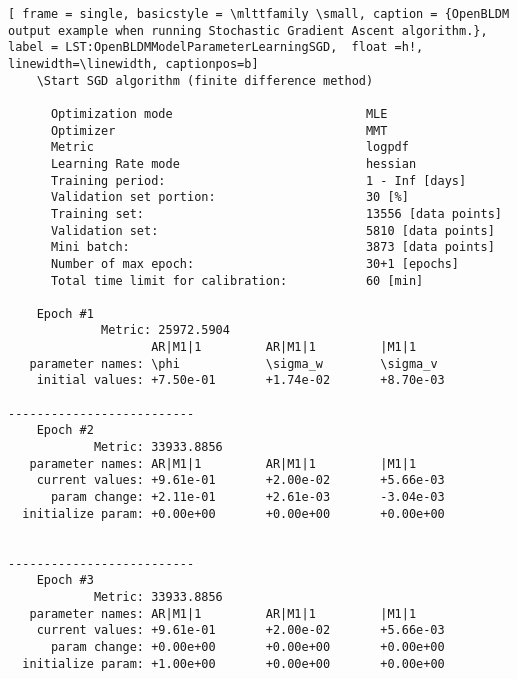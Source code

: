  \begin{lstlisting}[ frame = single, basicstyle = \mlttfamily \small, caption = {OpenBLDM output example when running Stochastic Gradient Ascent algorithm.}, label = LST:OpenBLDMModelParameterLearningSGD,  float =h!, linewidth=\linewidth, captionpos=b]
    \Start SGD algorithm (finite difference method)

      Optimization mode                           MLE
      Optimizer                                   MMT
      Metric                                      logpdf
      Learning Rate mode                          hessian
      Training period:                            1 - Inf [days]
      Validation set portion:                     30 [%]
      Training set:                               13556 [data points]
      Validation set:                             5810 [data points]
      Mini batch:                                 3873 [data points]
      Number of max epoch:                        30+1 [epochs]
      Total time limit for calibration:           60 [min]

    Epoch #1
             Metric: 25972.5904
                    AR|M1|1         AR|M1|1         |M1|1           
   parameter names: \phi            \sigma_w        \sigma_v        
    initial values: +7.50e-01       +1.74e-02       +8.70e-03       

--------------------------
    Epoch #2
            Metric: 33933.8856
   parameter names: AR|M1|1         AR|M1|1         |M1|1           
    current values: +9.61e-01       +2.00e-02       +5.66e-03      
      param change: +2.11e-01       +2.61e-03       -3.04e-03      
  initialize param: +0.00e+00       +0.00e+00       +0.00e+00      


--------------------------
    Epoch #3
            Metric: 33933.8856
   parameter names: AR|M1|1         AR|M1|1         |M1|1           
    current values: +9.61e-01       +2.00e-02       +5.66e-03      
      param change: +0.00e+00       +0.00e+00       +0.00e+00      
  initialize param: +1.00e+00       +0.00e+00       +0.00e+00 
\end{lstlisting}






